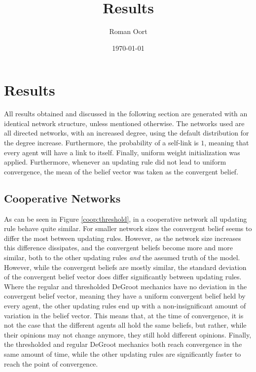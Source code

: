 \documentclass{article}
\title{Results}
\author{Roman Oort}
\date{\today}
\begin{document}
\maketitle

\tableofcontents
\newpage
\section{Results}

All results obtained and discussed in the following section are generated with an identical network structure, unless mentioned otherwise. The networks used are all directed networks, with an increased degree, using the default distribution for the degree increase. Furthermore, the probability of a self-link is $1$, meaning that every agent will have a link to itself. Finally, uniform weight initialization was applied. Furthermore, whenever an updating rule did not lead to uniform convergence, the mean of the belief vector was taken as the convergent belief.

\newpage

\subsection{Cooperative Networks}

As can be seen in Figure \ref{coop:threshold}, in a cooperative network all updating rule behave quite similar. For smaller network sizes the convergent belief seems to differ the most between updating rules. However, as the network size increases this difference dissipates, and the convergent beliefs become more and more similar, both to the other updating rules \emph{and} the assumed truth of the model. However, while the convergent beliefs are mostly similar, the standard deviation of the convergent belief vector does differ significantly between updating rules. Where the regular and thresholded DeGroot mechanics have no deviation in the convergent belief vector, meaning they have a uniform convergent belief held by every agent, the other updating rules end up with a non-insignificant amount of variation in the belief vector. This means that, at the time of convergence, it is not the case that the different agents all hold the same beliefs, but rather, while their opinions may not change anymore, they still hold different opinions. Finally, the thresholded and regular DeGroot mechanics both reach convergence in the same amount of time, while the other updating rules are significantly faster to reach the point of convergence.
\end{document}

